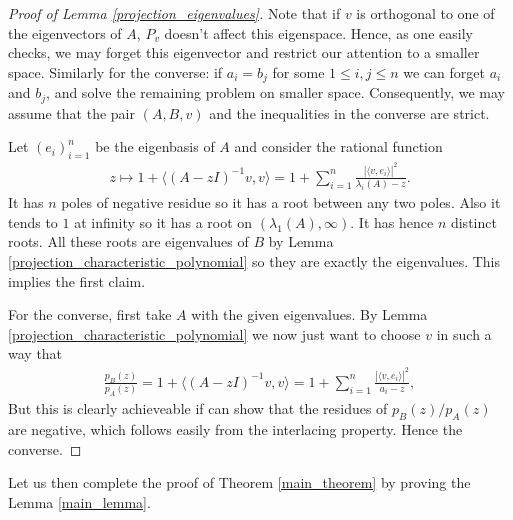 \begin{proof}[Proof of Lemma \ref{projection_eigenvalues}]
	Note that if $v$ is orthogonal to one of the eigenvectors of $A$, $P_{v}$ doesn't affect this eigenspace. Hence, as one easily checks, we may forget this eigenvector and restrict our attention to a smaller space. Similarly for the converse: if $a_{i} = b_{j}$ for some $1 \leq i, j \leq n$ we can forget $a_{i}$ and $b_{j}$, and solve the remaining problem on smaller space. Consequently, we may assume that the pair $(A, B, v)$ and the inequalities in the converse are strict.

	Let $(e_{i})_{i = 1}^{n}$ be the eigenbasis of $A$ and consider the rational function
	\begin{align*}
		z \mapsto 1 + \langle (A - z I)^{-1}v, v\rangle = 1 + \sum_{i = 1}^{n} \frac{|\langle v, e_{i} \rangle|^2}{\lambda_{i}(A) - z}.
	\end{align*}
	It has $n$ poles of negative residue so it has a root between any two poles. Also it tends to $1$ at infinity so it has a root on $(\lambda_{1}(A), \infty)$. It has hence $n$ distinct roots. All these roots are eigenvalues of $B$ by Lemma \ref{projection_characteristic_polynomial} so they are exactly the eigenvalues. This implies the first claim.

	For the converse, first take $A$ with the given eigenvalues. By Lemma \ref{projection_characteristic_polynomial} we now just want to choose $v$ in such a way that
	\begin{align*}
		\frac{p_{B}(z)}{p_{A}(z)} = 1 + \langle (A - z I)^{-1}v, v\rangle= 1 + \sum_{i = 1}^{n} \frac{|\langle v, e_{i} \rangle|^2}{a_{i} - z},
	\end{align*}
	But this is clearly achieveable if can show that the residues of $p_{B}(z)/p_{A}(z)$ are negative, which follows easily from the interlacing property. Hence the converse.
\end{proof}

Let us then complete the proof of Theorem \ref{main_theorem} by proving the Lemma \ref{main_lemma}.


